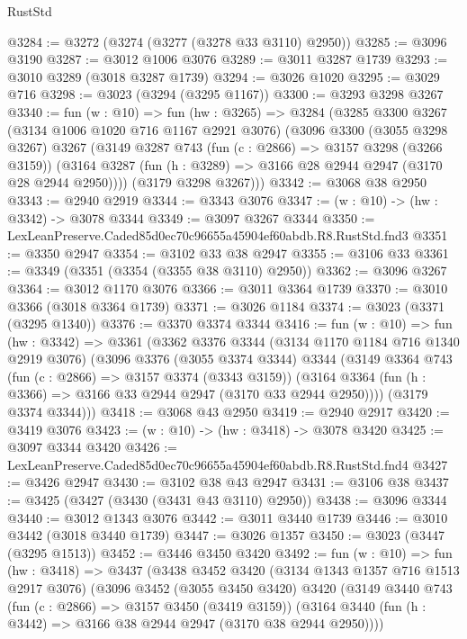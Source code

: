 \begin{lexlean}{RustStd}
\begin{coremodule}
@3284 := @3272 (@3274 (@3277 (@3278 @33 @3110) @2950))
@3285 := @3096 @3190
@3287 := @3012 @1006 @3076
@3289 := @3011 @3287 @1739
@3293 := @3010 @3289 (@3018 @3287 @1739)
@3294 := @3026 @1020
@3295 := @3029 @716
@3298 := @3023 (@3294 (@3295 @1167))
@3300 := @3293 @3298 @3267
@3340 := fun (w : @10) =>
  fun (hw : @3265) =>
  @3284
    (@3285
      @3300
      @3267
      (@3134 @1006 @1020 @716 @1167 @2921 @3076)
      (@3096
        @3300
        (@3055 @3298 @3267)
        @3267
        (@3149
          @3287
          @743
          (fun (c : @2866) => @3157 @3298 (@3266 @3159))
          (@3164 @3287 (fun (h : @3289) => @3166 @28 @2944 @2947 (@3170 @28 @2944 @2950))))
        (@3179 @3298 @3267)))
@3342 := @3068 @38 @2950
@3343 := @2940 @2919
@3344 := @3343 @3076
@3347 := (w : @10) -> (hw : @3342) -> @3078 @3344
@3349 := @3097 @3267 @3344
@3350 := LexLeanPreserve.Caded85d0ec70c96655a45904ef60abdb.R8.RustStd.fnd3
@3351 := @3350 @2947
@3354 := @3102 @33 @38 @2947
@3355 := @3106 @33
@3361 := @3349 (@3351 (@3354 (@3355 @38 @3110) @2950))
@3362 := @3096 @3267
@3364 := @3012 @1170 @3076
@3366 := @3011 @3364 @1739
@3370 := @3010 @3366 (@3018 @3364 @1739)
@3371 := @3026 @1184
@3374 := @3023 (@3371 (@3295 @1340))
@3376 := @3370 @3374 @3344
@3416 := fun (w : @10) =>
  fun (hw : @3342) =>
  @3361
    (@3362
      @3376
      @3344
      (@3134 @1170 @1184 @716 @1340 @2919 @3076)
      (@3096
        @3376
        (@3055 @3374 @3344)
        @3344
        (@3149
          @3364
          @743
          (fun (c : @2866) => @3157 @3374 (@3343 @3159))
          (@3164 @3364 (fun (h : @3366) => @3166 @33 @2944 @2947 (@3170 @33 @2944 @2950))))
        (@3179 @3374 @3344)))
@3418 := @3068 @43 @2950
@3419 := @2940 @2917
@3420 := @3419 @3076
@3423 := (w : @10) -> (hw : @3418) -> @3078 @3420
@3425 := @3097 @3344 @3420
@3426 := LexLeanPreserve.Caded85d0ec70c96655a45904ef60abdb.R8.RustStd.fnd4
@3427 := @3426 @2947
@3430 := @3102 @38 @43 @2947
@3431 := @3106 @38
@3437 := @3425 (@3427 (@3430 (@3431 @43 @3110) @2950))
@3438 := @3096 @3344
@3440 := @3012 @1343 @3076
@3442 := @3011 @3440 @1739
@3446 := @3010 @3442 (@3018 @3440 @1739)
@3447 := @3026 @1357
@3450 := @3023 (@3447 (@3295 @1513))
@3452 := @3446 @3450 @3420
@3492 := fun (w : @10) =>
  fun (hw : @3418) =>
  @3437
    (@3438
      @3452
      @3420
      (@3134 @1343 @1357 @716 @1513 @2917 @3076)
      (@3096
        @3452
        (@3055 @3450 @3420)
        @3420
        (@3149
          @3440
          @743
          (fun (c : @2866) => @3157 @3450 (@3419 @3159))
          (@3164 @3440 (fun (h : @3442) => @3166 @38 @2944 @2947 (@3170 @38 @2944 @2950))))

\end{coremodule}
\end{lexlean}
